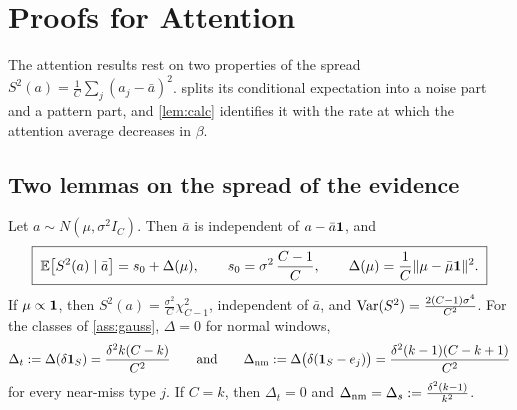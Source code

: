 \section{Proofs for Attention}\label{app:proofs34}

The attention results rest on two properties of the spread $S^2(a)=\frac1C\sum_j(a_j-\bar a)^2$.  splits its conditional expectation into a noise part and a pattern part, and \cref{lem:calc} identifies it with the rate at which the attention average decreases in $\beta$.

\subsection{Two lemmas on the spread of the evidence}\label{app:lemmas}

\begin{lemma}\label{lem:gauss}
Let $a\sim N(\mu,\sigma^2I_C)$. Then $\bar a$ is independent of $a-\bar a\mathbf{1}$, and
\begin{equation}\label{eq:spread-mean}
  \boxed{\;\mathbb{E}\big[S^2(a)\mid\bar a\big]=s_0+\Delta(\mu),
  \qquad
  s_0=\sigma^2\,\frac{C-1}{C},
  \qquad
  \Delta(\mu)=\frac1C\|\mu-\bar\mu\mathbf{1}\|^2 .\;}
\end{equation}
If $\mu\propto\mathbf{1}$, then $S^2(a)=\frac{\sigma^2}{C}\chi^2_{C-1}$, independent of $\bar a$, and $\operatorname{Var}(S^2)=\frac{2(C-1)\sigma^4}{C^2}$.
For the classes of \cref{ass:gauss}, $\Delta=0$ for normal windows,
\begin{equation}\label{eq:deltas}
  \Delta_t:=\Delta(\delta\mathbf{1}_S)=\frac{\delta^2k(C-k)}{C^2}
  \qquad\text{and}\qquad
  \Delta_{\mathrm{nm}}:=\Delta\big(\delta(\mathbf{1}_S-e_j)\big)=\frac{\delta^2(k-1)(C-k+1)}{C^2}
\end{equation}
for every near-miss type $j$. If $C=k$, then $\Delta_t=0$ and $\Delta_{\mathrm{nm}}=\Delta_s:=\frac{\delta^2(k-1)}{k^2}$.
\end{lemma}

